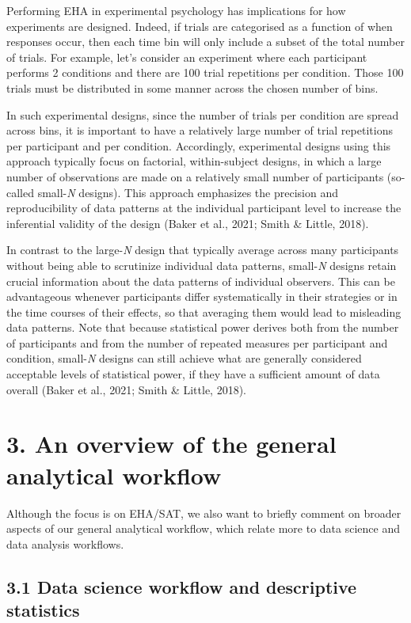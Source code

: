 \documentclass[
  man, donotrepeattitle,floatsintext]{apa6}
\begin{document}
Performing EHA in experimental psychology has implications for how experiments are designed. Indeed, if trials are categorised as a function of when responses occur, then each time bin will only include a subset of the total number of trials. For example, let's consider an experiment where each participant performs 2 conditions and there are 100 trial repetitions per condition. Those 100 trials must be distributed in some manner across the chosen number of bins.

In such experimental designs, since the number of trials per condition are spread across bins, it is important to have a relatively large number of trial repetitions per participant and per condition. Accordingly, experimental designs using this approach typically focus on factorial, within-subject designs, in which a large number of observations are made on a relatively small number of participants (so-called small-\emph{N} designs). This approach emphasizes the precision and reproducibility of data patterns at the individual participant level to increase the inferential validity of the design (Baker et al., 2021; Smith \& Little, 2018).

In contrast to the large-\emph{N} design that typically average across many participants without being able to scrutinize individual data patterns, small-\emph{N} designs retain crucial information about the data patterns of individual observers. This can be advantageous whenever participants differ systematically in their strategies or in the time courses of their effects, so that averaging them would lead to misleading data patterns. Note that because statistical power derives both from the number of participants and from the number of repeated measures per participant and condition, small-\emph{N} designs can still achieve what are generally considered acceptable levels of statistical power, if they have a sufficient amount of data overall (Baker et al., 2021; Smith \& Little, 2018).

\section{3. An overview of the general analytical workflow}\label{an-overview-of-the-general-analytical-workflow}

Although the focus is on EHA/SAT, we also want to briefly comment on broader aspects of our general analytical workflow, which relate more to data science and data analysis workflows.

\subsection{3.1 Data science workflow and descriptive statistics}\label{data-science-workflow-and-descriptive-statistics}
\end{document}
